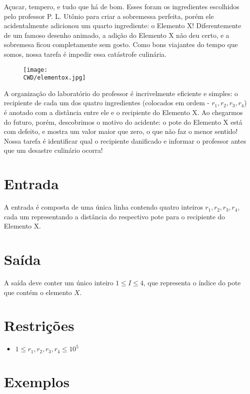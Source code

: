 Açucar, tempero, e tudo que há de bom. Esses foram os ingredientes escolhidos pelo professor P. L. Utônio para criar a sobremessa perfeita,
porém ele acidentalmente adicionou um quarto ingrediente: o Elemento X! Diferentemente de um famoso desenho animado, a adição do Elemento X não deu certo,
e a sobremesa ficou completamente sem gosto. Como bons viajantes do tempo que somos, nossa tarefa é impedir essa catástrofe culinária.

\begin{figure}[H]
    \centering
    \texttt{[image: \\CWD/elementox.jpg]}
\end{figure}

A organização do laboratório do professor é incrivelmente eficiente e simples: o recipiente de cada um dos quatro ingredientes (colocados em ordem - $r_1, r_2, r_3, r_4$)
é anotado com a distância entre ele e o recipiente do Elemento X. Ao chegarmos do futuro, porém, descobrimos o motivo do acidente:
o pote do Elemento X está com defeito, e mostra um valor maior que zero, o que não faz o menor sentido!
Nossa tarefa é identificar qual o recipiente danificado e informar o professor antes que um desastre culinário ocorra!

\section*{Entrada}

A entrada é composta de uma única linha contendo quatro inteiros $r_1, r_2, r_3, r_4$, cada um representando a distância do respectivo pote
para o recipiente do Elemento X.

\section*{Saída}

A saída deve conter um único inteiro $1 \leq I \leq 4$, que representa o índice do pote que contém o elemento $X$.

\section*{Restrições}

\begin{itemize}
\item $ 1 \leq r_1, r_2, r_3, r_4 \leq 10^5$
\end{itemize}

\section*{Exemplos}

\exemplo
